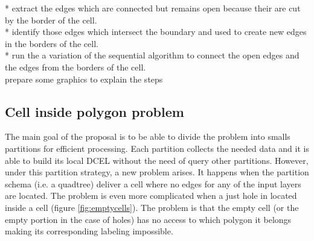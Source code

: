 * extract the edges which are connected but remains open because their are cut by the border of the cell.\\
* identify those edges which intersect the boundary and used to create new edges in the borders of the cell.\\  
* run the a variation of the sequential algorithm to connect the open edges and the edges from the borders of the cell.\\

prepare some graphics to explain the steps

\subsection{Cell inside polygon problem} \label{sec:anomalies}
The main goal of the proposal is to be able to divide the problem into smalls partitions for efficient processing.  Each partition collects the needed data and it is able to build its local DCEL without the need of query other partitions.  However, under this partition strategy, a new problem arises.  It happens when the partition schema (i.e. a quadtree) deliver a cell where no edges for any of the input layers are located.  The problem is even more complicated when a just hole in located inside a cell (figure \ref{fig:emptycells}).  The problem is that the empty cell (or the empty portion in the case of holes) has no access to which polygon it belongs making its corresponding labeling impossible.  


